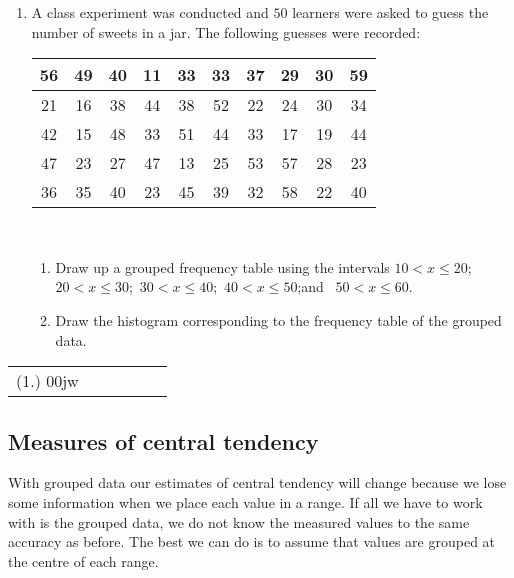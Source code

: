 \begin{exercises}{}{
    \begin{enumerate}[itemsep=5pt, label=\textbf{\arabic*}. ]
    \item  A class experiment was conducted and $50$ learners were asked to
      guess the number of sweets in a jar. The following guesses were
      recorded:
      \\
      \begin{center}
        \begin{tabular}{|c|c|c|c|c|c|c|c|c|c|} \hline
          56 & 49 & 40 & 11 & 33 & 33 & 37 & 29 & 30 & 59 \\ \hline
          21 & 16 & 38 & 44 & 38 & 52 & 22 & 24 & 30 & 34 \\\hline
          42 & 15 & 48 & 33 & 51 & 44 & 33 & 17 & 19 & 44 \\\hline
          47 & 23 & 27 & 47 & 13 & 25 & 53 & 57 & 28 & 23 \\\hline
          36 & 35 & 40 & 23 & 45 & 39 & 32 & 58 & 22 & 40 \\\hline
        \end{tabular}
      \end{center}
      \vspace{8pt}\\

      \begin{enumerate}[noitemsep, label=\textbf{(\alph*)} ]
      \item
        Draw up a grouped frequency table using the intervals
        $10 < x \leq 20$;\ $20 < x \leq 30$;\ $30 < x \leq 40$;\ 
        $40 < x \leq 50$;and \ $50 < x \leq 60$.
      \item Draw the histogram corresponding to the frequency table of the
        grouped data.
      \end{enumerate}
    \end{enumerate}
\practiceinfo
\par 
\par \begin{tabular}[h]{cccccc}
(1.) 00jw& \end{tabular}
}
\end{exercises}
% 
\subsection*{Measures of central tendency}
With grouped data our estimates of central tendency will change
because we lose some information when we place each value in a range.
If all we have to work with is the grouped data, we do not know the
measured values to the same accuracy as before. The best we can do is
to assume that values are grouped at the centre of each range.\par

